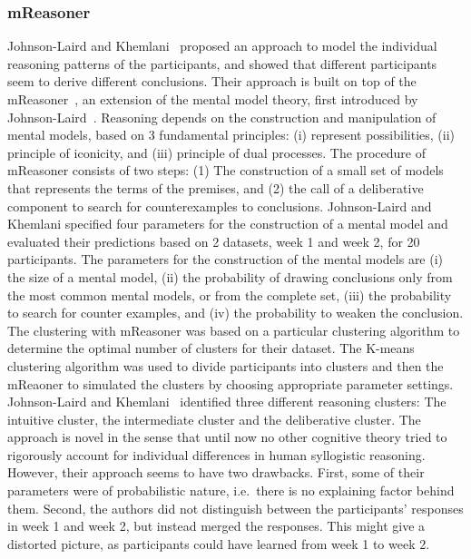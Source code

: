 \documentclass[12pt]{article}
\begin{document}
\subsubsection{mReasoner}

Johnson-Laird and Khemlani~\cite{khemlani:2016} proposed an approach to model the individual reasoning patterns of the participants, and 
showed that different participants seem to derive different conclusions.
Their approach is built on top of the mReasoner~\cite{khemlani:2013}, an extension of the mental model theory, first introduced by Johnson-Laird~\cite{johnsonlaird:1983}.
Reasoning depends on the construction and manipulation of mental models, based on 3 fundamental principles: 
(i) represent possibilities, (ii) principle of iconicity, and (iii) principle of dual processes.
 The procedure of mReasoner consists of two steps:
(1) The construction of a small set of models that represents the terms of the premises, and
(2) the call of a deliberative component to search for counterexamples to conclusions.
Johnson-Laird and Khemlani specified four parameters for the construction of a mental model and evaluated their
predictions based on 2 datasets, week 1 and week 2, for 20 participants.
The parameters for the construction of the mental models are (i) the 
size of a mental model, (ii) the probability of drawing conclusions only from the most common mental models, or from the complete set,
(iii) the probability to search for counter examples,
and (iv) the probability to weaken the conclusion.
The clustering with mReasoner was based on a particular clustering algorithm to determine the optimal number of clusters for their dataset.
The K-means clustering algorithm was used to divide participants into clusters and then
the mReaoner to simulated the clusters by choosing appropriate parameter settings.
Johnson-Laird and Khemlani~\cite{khemlani:2016} identified three different reasoning clusters: The intuitive cluster, the intermediate cluster and the deliberative cluster.
The approach is novel in the sense that until now no other cognitive theory tried to rigorously account for individual differences in human syllogistic reasoning. However, their approach seems to have two drawbacks. First, some of their 
parameters were of probabilistic nature, i.e.\ there is no explaining factor behind them. Second, the authors did not distinguish between the participants' 
responses in week 1 and week 2, but instead merged the responses. This might give a distorted picture, as participants could
have learned from week 1 to week 2.
\end{document}

